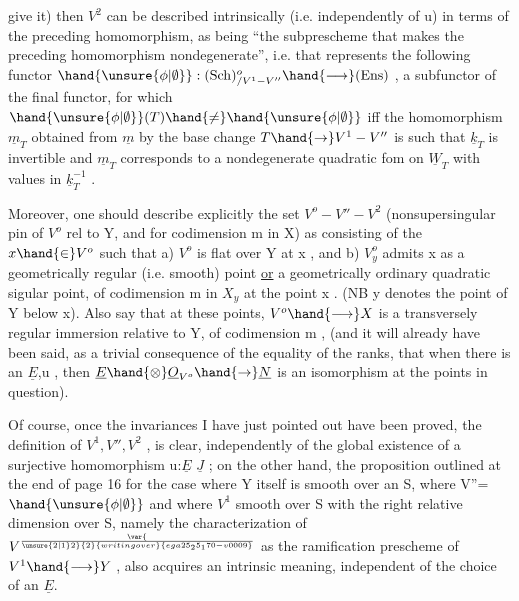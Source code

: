 give it) then $V^2$ can be described intrinsically (i.e. independently of u)
 in terms of the preceding homomorphism, as being ``the subprescheme
that makes the preceding homomorphism nondegenerate'', i.e. that represents the
following functor $\hand{\unsure{\phi|\emptyset}} : (\mathrm{Sch})^{o}_{/V^1 - V''} \hand{\longrightarrow} (\mathrm{Ens})$ , a subfunctor
of the final functor, for which $\hand{\unsure{\phi|\emptyset}}(T)\hand{\neq} \hand{\unsure{\phi|\emptyset}}$ iff the homomorphism $\underline{m}_T$ obtained
from $\underline{m}$ by the base change $T \hand{\to} V^1 - V''$ is such that $\underline{k}_T$ is invertible and
$\underline{m}_T$ corresponds to a nondegenerate quadratic fom on $\underline{W}_T$ with values in
$\underline{k}_T^{-1}$ .

Moreover, one should describe explicitly the set $V^o - V'' - V^2$ 
(nonsupersingular pin of $V^o$ rel to Y, and for codimension m in X)
as consisting of the $x \hand{\in} V^o$ such that a) $V^o$ is flat over Y at x , and
b) $V^o_y$ admits x as a geometrically regular (i.e. smooth) point \uline{or}
a geometrically ordinary quadratic sigular point,  of codimension m in $X_y$
at the point x . (NB y denotes the point of Y below x). Also say that at these
points, $V^o \hand{\longrightarrow} X$ is a transversely regular immersion relative to
Y, of codimension m , (and it will already have been said, as a trivial consequence of
the equality of the ranks, that when there is an $\underline{E}$,u , then $\underline{E}\hand{\otimes}\underline{O}_{V^o} \hand{\to} \underline{N}$ is an
isomorphism at the points in question).

Of course, once the invariances I have just pointed out have been proved,
the definition of $V^1, V'', V^2$ ,  is clear, independently
of the global existence of a surjective homomorphism u:$\underline{E}$ \quad $\underline{J}$ ; on the other hand,
the proposition outlined at the end of page 16 for the case where Y itself is
smooth over an S, where V''= $\hand{\unsure{\phi|\emptyset}}$ and where \hand{,} $V^1$  smooth over S with the right relative
dimension over S,  namely the characterization of $V^{\var{\over{\unsure{2|1}}{2}}{2}{writing over}{ega25_25_170-v0009}}$ as the
ramification prescheme of $V^1 \hand{\longrightarrow} Y$ , also acquires an intrinsic meaning,
independent of the choice of an $\underline{E}$.

